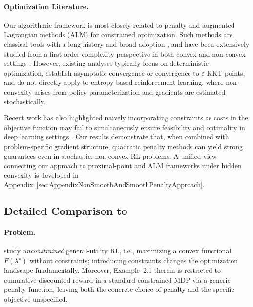 \documentclass{article}
\theoremstyle{plain}
\theoremstyle{definition}
\theoremstyle{remark}
\def\epsilon{{\varepsilon}}
\begin{document}
\paragraph{Optimization Literature.}
Our algorithmic framework is most closely related to penalty and augmented
Lagrangian methods (ALM) for constrained optimization. Such methods are
classical tools with a long history and broad adoption
\cite{courantVariationalMethodsSolution1943,
 fiaccoNonlinearProgrammingSequential1990,
 bertsekasNonlinearProgramming1999, boydConvexOptimization2004,
 nesterovLecturesConvexOptimization2018}, and have been extensively studied
from a first-order complexity perspective in both convex and non-convex
settings \cite{aybatFirstOrderAugmentedLagrangian2012,
 lanIterationcomplexityFirstorderPenalty2013,
 necoaraComplexityFirstorderInexact2019, liAugmentedLagrangianBased2021}.
However, existing analyses typically focus on deterministic optimization,
establish asymptotic convergence or convergence to $\epsilon$-KKT points,
and do not directly apply to entropy-based reinforcement learning, where
non-convexity arises from policy parameterization and gradients are
estimated stochastically.

Recent work has also highlighted naively incorporating constraints as costs
in the objective function may fail to simultaneously ensure feasibility and
optimality in deep learning settings
\cite{ramirezPositionAdoptConstraints2025}. Our results demonstrate that,
when combined with problem-specific gradient structure, quadratic penalty
methods can yield strong guarantees even in stochastic, non-convex RL
problems. A unified view connecting our approach to proximal-point and ALM
frameworks under hidden convexity is developed in
Appendix~\ref{sec:AppendixNonSmoothAndSmoothPenaltyApproach}.

\subsection{Detailed Comparison to \citet{zhangVariationalPolicyGradient2020}}

\paragraph{Problem.}
\citet{zhangVariationalPolicyGradient2020} study \emph{unconstrained}
general-utility RL, i.e., maximizing a convex functional $F(\lambda^\pi)$
without constraints; introducing constraints changes the
optimization landscape fundamentally.
Moreover, Example~2.1 therein is restricted to cumulative discounted reward
in a standard constrained MDP via a generic penalty function, leaving both
the concrete choice of penalty and the specific objective unspecified.
\end{document}
